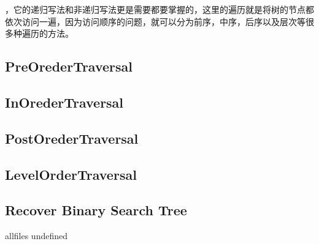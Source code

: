 \documentclass{article}
\begin{document}
\begin{CJK}{UTF8}{gbsn}     %

\else
    
，它的递归写法和非递归写法更是需要都要掌握的，这里的遍历就是将树的节点都依次访问一遍，因为访问顺序的问题，就可以分为前序，中序，后序以及层次等很多种遍历的方法。
\subsection{PreOrederTraversal}

\subsection{InOrederTraversal}

\subsection{PostOrederTraversal}

\subsection{LevelOrderTraversal}

\subsection{Recover Binary Search Tree }


\fi

\ifx allfiles undefined
\end{CJK}
\end{document}

